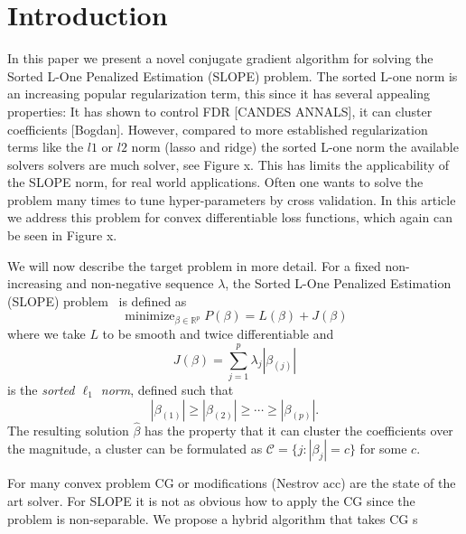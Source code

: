 \section{Introduction}\label{sec:introduction}

In this paper we present a novel conjugate gradient algorithm for solving the 
Sorted L-One Penalized Estimation (SLOPE) problem. The sorted L-one norm is an increasing popular regularization term, this since it has several appealing properties: It has shown to control FDR [CANDES ANNALS], it can cluster coefficients [Bogdan]. However, compared to more established regularization terms like the $l1$ or $l2$ norm (lasso and ridge) the sorted L-one norm the available solvers solvers are much solver, see Figure x. This has limits the applicability of the SLOPE norm, for real world applications. Often one wants to solve the problem many times to tune hyper-parameters by cross validation.   In this article we address this problem for convex differentiable loss functions, which again can be seen in Figure x. 

We will now describe the target problem in more detail.
For a fixed non-increasing and non-negative sequence \(\lambda\), the
Sorted L-One Penalized Estimation (SLOPE) problem~\cite{bogdan2013,bogdan2015}
is defined as
\begin{equation}
  \label{eq:slope-problem}
  \operatorname{minimize}_{\beta \in \mathbb{R}^p}
  P(\beta) = L(\beta) + J(\beta)
\end{equation}
where we take \(L\) to be smooth and twice differentiable and
\begin{equation}
  \label{eq:sortedl-l1-norm}
  J(\beta) = \sum_{j=1}^p \lambda_j|\beta_{(j)}|
\end{equation}
is the \emph{sorted \(\ell_1\) norm}, defined such that
\[
  |\beta_{(1)}| \geq |\beta_{(2)}| \geq \cdots \geq |\beta_{(p)}|.
\]
The resulting solution $\hat{\beta}$ has the property that it can cluster the coefficients over the magnitude, a cluster can be formulated as $\mathcal{C}= \{j: |\beta_j|=c\}$ for some $c$. 



For many convex problem CG or modifications (Nestrov acc) are the state of the art solver. For SLOPE it is not as obvious how to apply the CG since the problem is non-separable. 
We propose a hybrid algorithm that takes CG s